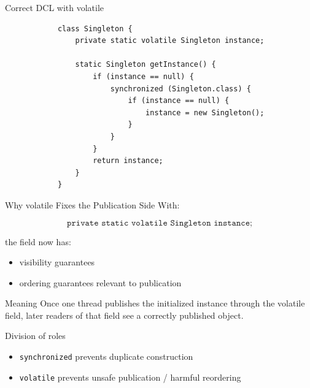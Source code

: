 \documentclass[aspectratio=169,11pt]{beamer}
\begin{document}
	\begin{frame}[fragile]{Correct DCL with volatile}
		\begin{lstlisting}
			class Singleton {
				private static volatile Singleton instance;
				
				static Singleton getInstance() {
					if (instance == null) {
						synchronized (Singleton.class) {
							if (instance == null) {
								instance = new Singleton();
							}
						}
					}
					return instance;
				}
			}
		\end{lstlisting}
	\end{frame}
	
	\begin{frame}{Why volatile Fixes the Publication Side}
		With:
		
		\[
		\texttt{private static volatile Singleton instance;}
		\]
		
		the field now has:
		\begin{itemize}
			\item visibility guarantees
			\item ordering guarantees relevant to publication
		\end{itemize}
		
		\vspace{0.35cm}
		
		\begin{block}{Meaning}
			Once one thread publishes the initialized instance through the volatile field, later readers of that field see a correctly published object.
		\end{block}
		
		\vspace{0.25cm}
		
		\begin{exampleblock}{Division of roles}
			\begin{itemize}
				\item \texttt{synchronized} prevents duplicate construction
				\item \texttt{volatile} prevents unsafe publication / harmful reordering
			\end{itemize}
		\end{exampleblock}
	\end{frame}
	
\end{document}

